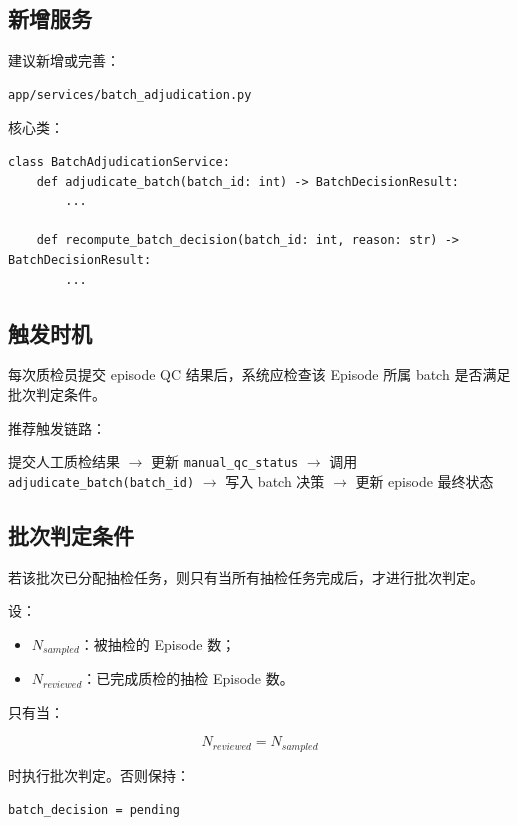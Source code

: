 \documentclass[UTF8,12pt,a4paper]{ctexart}
\begin{document}
\subsection{新增服务}

建议新增或完善：

\begin{lstlisting}
app/services/batch_adjudication.py
\end{lstlisting}

核心类：

\begin{lstlisting}
class BatchAdjudicationService:
    def adjudicate_batch(batch_id: int) -> BatchDecisionResult:
        ...

    def recompute_batch_decision(batch_id: int, reason: str) -> BatchDecisionResult:
        ...
\end{lstlisting}

\subsection{触发时机}

每次质检员提交 episode QC 结果后，系统应检查该 Episode 所属 batch 是否满足批次判定条件。

推荐触发链路：

\begin{center}
提交人工质检结果 $\rightarrow$ 更新 \texttt{manual\_qc\_status} $\rightarrow$ 调用 \texttt{adjudicate\_batch(batch\_id)} $\rightarrow$ 写入 batch 决策 $\rightarrow$ 更新 episode 最终状态
\end{center}

\subsection{批次判定条件}

若该批次已分配抽检任务，则只有当所有抽检任务完成后，才进行批次判定。

设：

\begin{itemize}
  \item $N_{sampled}$：被抽检的 Episode 数；
  \item $N_{reviewed}$：已完成质检的抽检 Episode 数。
\end{itemize}

只有当：

\[
N_{reviewed}=N_{sampled}
\]

时执行批次判定。否则保持：

\begin{lstlisting}
batch_decision = pending
\end{lstlisting}
\end{document}
